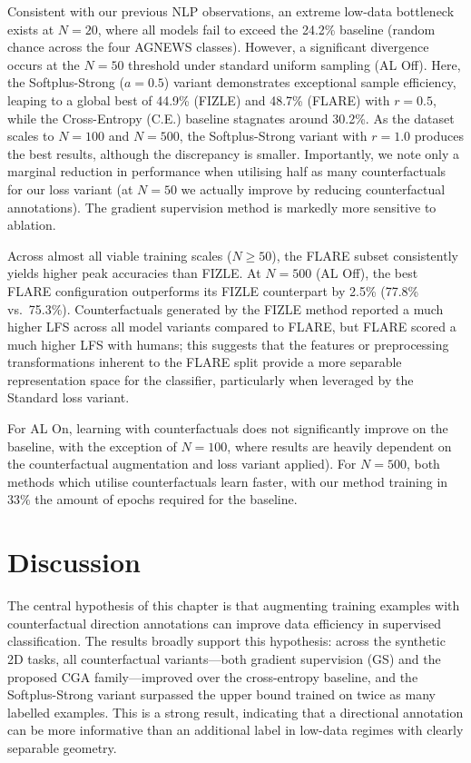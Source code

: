 Consistent with our previous NLP observations, an extreme low-data bottleneck exists at $N=20$, where all models fail to exceed the 24.2\% baseline (random chance across the four AGNEWS classes). However, a significant divergence occurs at the $N=50$ threshold under standard uniform sampling (AL Off). Here, the Softplus-Strong ($a=0.5$) variant demonstrates exceptional sample efficiency, leaping to a global best of 44.9\% (FIZLE) and 48.7\% (FLARE) with $r=0.5$, while the Cross-Entropy (C.E.) baseline stagnates around 30.2\%. As the dataset scales to $N=100$ and $N=500$, the Softplus-Strong variant with $r=1.0$ produces the best results, although the discrepancy is smaller. Importantly, we note only a marginal reduction in performance when utilising half as many counterfactuals for our loss variant (at $N=50$ we actually improve by reducing counterfactual annotations). The gradient supervision method is markedly more sensitive to ablation.

Across almost all viable training scales ($N \ge 50$), the FLARE subset consistently yields higher peak accuracies than FIZLE. At $N=500$ (AL Off), the best FLARE configuration outperforms its FIZLE counterpart by 2.5\% (77.8\% vs.\ 75.3\%). Counterfactuals generated by the FIZLE method reported a much higher LFS across all model variants compared to FLARE, but FLARE scored a much higher LFS with humans\cite{wang2025truthtwistoptimalmodel}; this suggests that the features or preprocessing transformations inherent to the FLARE split provide a more separable representation space for the classifier, particularly when leveraged by the Standard loss variant.

For AL On, learning with counterfactuals does not significantly improve on the baseline, with the exception of $N=100$, where results are heavily dependent on the counterfactual augmentation and loss variant applied). For $N=500$, both methods which utilise counterfactuals learn faster, with our method training in ~$33\%$ the amount of epochs required for the baseline.


\section{Discussion}
\label{sec:discussion}
The central hypothesis of this chapter is that augmenting training examples with counterfactual direction annotations can improve data efficiency in supervised classification. The results broadly support this hypothesis: across the synthetic 2D tasks, all counterfactual variants---both gradient supervision (GS) and the proposed CGA family---improved over the cross-entropy baseline, and the Softplus-Strong variant surpassed the upper bound trained on twice as many labelled examples. This is a strong result, indicating that a directional annotation can be more informative than an additional label in low-data regimes with clearly separable geometry.

